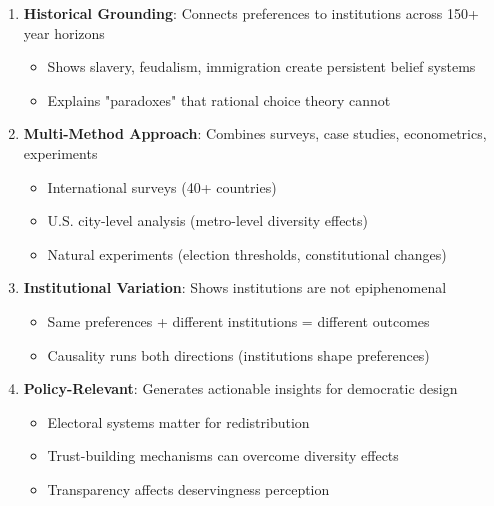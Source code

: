 \begin{tcolorbox}[colback=blue!5!white, colframe=blue!75!black,
    title=Alesina's Strengths]

\begin{enumerate}

\item \textbf{Historical Grounding}: Connects preferences to institutions across 150+ year horizons
   \begin{itemize}
   \item Shows slavery, feudalism, immigration create persistent belief systems
   \item Explains "paradoxes" that rational choice theory cannot
   \end{itemize}

\item \textbf{Multi-Method Approach}: Combines surveys, case studies, econometrics, experiments
   \begin{itemize}
   \item International surveys (40+ countries)
   \item U.S. city-level analysis (metro-level diversity effects)
   \item Natural experiments (election thresholds, constitutional changes)
   \end{itemize}

\item \textbf{Institutional Variation}: Shows institutions are not epiphenomenal
   \begin{itemize}
   \item Same preferences + different institutions = different outcomes
   \item Causality runs both directions (institutions shape preferences)
   \end{itemize}

\item \textbf{Policy-Relevant}: Generates actionable insights for democratic design
   \begin{itemize}
   \item Electoral systems matter for redistribution
   \item Trust-building mechanisms can overcome diversity effects
   \item Transparency affects deservingness perception
   \end{itemize}

\end{enumerate}

\end{tcolorbox}

